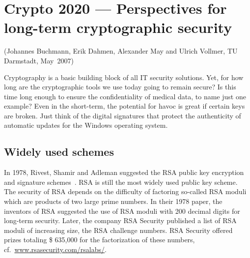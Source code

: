 
\newpage
\hypertarget{Chapter_Crypto2020}{}
\chapter{Crypto 2020 --- Perspectives for long-term cryptographic
         security}
\label{Chapter_Crypto2020}
\begin{sloppypar}
(Johannes Buchmann, Erik Dahmen, Alexander May and Ulrich Vollmer, TU Darmstadt, May~2007)\\
\end{sloppypar}


Cryptography is a basic building block of all IT
security solutions.  Yet, for how long are the
cryptographic tools we use today going to remain
secure?  Is this time long enough to ensure the
confidentiality of medical data, to name just one
example?  Even in the short-term, the potential
for havoc is great if certain keys are broken.
Just think of the digital signatures that protect
the authenticity of automatic updates for the
Windows operating system.


\section{Widely used schemes}
\label{sec:the-weak}

In 1978, Rivest, Shamir and Adleman suggested the
RSA public key encryption and signature
schemes~\cite{rivest/shamir/adleman:1978}.  RSA is
still the most widely used public key scheme.  The
security of RSA depends on the difficulty of
factoring so-called RSA moduli which are products
of two large prime numbers.  In their 1978 paper,
the inventors of RSA suggested the use of RSA
moduli with 200 decimal digits for long-term
security.  Later, the company RSA Security
published a list of RSA moduli of increasing size,
the RSA challenge numbers.  RSA Security offered
prizes totaling \$ 635,000 for the factorization
of these numbers, cf.\
\url{www.rsasecurity.com/rsalabs/}.

